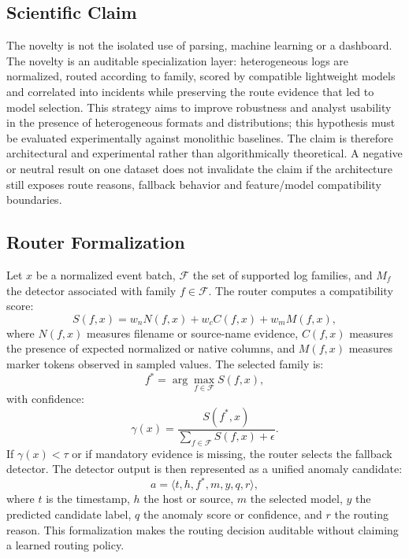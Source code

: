 \documentclass[conference]{IEEEtran}
\begin{document}
\subsection{Scientific Claim}
The novelty is not the isolated use of parsing, machine learning or a dashboard. The novelty is an auditable specialization layer: heterogeneous logs are normalized, routed according to family, scored by compatible lightweight models and correlated into incidents while preserving the route evidence that led to model selection. This strategy aims to improve robustness and analyst usability in the presence of heterogeneous formats and distributions; this hypothesis must be evaluated experimentally against monolithic baselines. The claim is therefore architectural and experimental rather than algorithmically theoretical. A negative or neutral result on one dataset does not invalidate the claim if the architecture still exposes route reasons, fallback behavior and feature/model compatibility boundaries.

\subsection{Router Formalization}
Let $x$ be a normalized event batch, $\mathcal{F}$ the set of supported log families, and $M_f$ the detector associated with family $f \in \mathcal{F}$. The router computes a compatibility score:
\begin{equation}
    S(f,x) = w_n N(f,x) + w_c C(f,x) + w_m M(f,x),
\end{equation}
where $N(f,x)$ measures filename or source-name evidence, $C(f,x)$ measures the presence of expected normalized or native columns, and $M(f,x)$ measures marker tokens observed in sampled values. The selected family is:
\begin{equation}
    f^{*} = \arg\max_{f \in \mathcal{F}} S(f,x),
\end{equation}
with confidence:
\begin{equation}
    \gamma(x) = \frac{S(f^{*},x)}{\sum_{f \in \mathcal{F}} S(f,x) + \epsilon}.
\end{equation}
If $\gamma(x) < \tau$ or if mandatory evidence is missing, the router selects the fallback detector. The detector output is then represented as a unified anomaly candidate:
\begin{equation}
    a = \langle t, h, f^{*}, m, y, q, r \rangle,
\end{equation}
where $t$ is the timestamp, $h$ the host or source, $m$ the selected model, $y$ the predicted candidate label, $q$ the anomaly score or confidence, and $r$ the routing reason. This formalization makes the routing decision auditable without claiming a learned routing policy.
\end{document}
